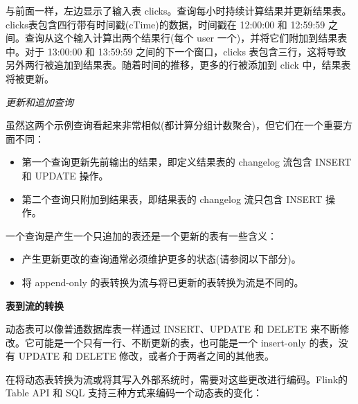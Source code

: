 \documentclass[cn,11pt,chinese]{elegantbook}
\providecommand{\tightlist}{%
  \setlength{\itemsep}{0pt}\setlength{\parskip}{0pt}}
\begin{document}
与前面一样，左边显示了输入表
clicks。查询每小时持续计算结果并更新结果表。clicks表包含四行带有时间戳(cTime)的数据，时间戳在
12:00:00 和 12:59:59 之间。查询从这个输入计算出两个结果行(每个 user
一个)，并将它们附加到结果表中。对于 13:00:00 和 13:59:59
之间的下一个窗口，clicks
表包含三行，这将导致另外两行被追加到结果表。随着时间的推移，更多的行被添加到
click 中，结果表将被更新。

\emph{更新和追加查询}

虽然这两个示例查询看起来非常相似(都计算分组计数聚合)，但它们在一个重要方面不同：

\begin{itemize}
\tightlist
\item
  第一个查询更新先前输出的结果，即定义结果表的 changelog 流包含 INSERT
  和 UPDATE 操作。
\item
  第二个查询只附加到结果表，即结果表的 changelog 流只包含 INSERT 操作。
\end{itemize}

一个查询是产生一个只追加的表还是一个更新的表有一些含义：

\begin{itemize}
\tightlist
\item
  产生更新更改的查询通常必须维护更多的状态(请参阅以下部分)。
\item
  将 append-only 的表转换为流与将已更新的表转换为流是不同的。
\end{itemize}

\textbf{表到流的转换}

动态表可以像普通数据库表一样通过 INSERT、UPDATE 和 DELETE
来不断修改。它可能是一个只有一行、不断更新的表，也可能是一个 insert-only
的表，没有 UPDATE 和 DELETE 修改，或者介于两者之间的其他表。

在将动态表转换为流或将其写入外部系统时，需要对这些更改进行编码。Flink的
Table API 和 SQL 支持三种方式来编码一个动态表的变化：
\end{document}
